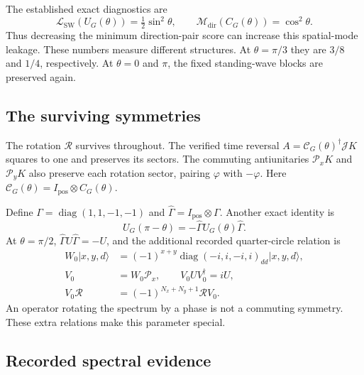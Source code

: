 \documentclass[11pt,a4paper,oneside]{report}
\newcommand{\ket}[1]{\lvert #1\rangle}
\newcommand{\CC}{\mathcal C}
\newcommand{\Id}{I}
\newcommand{\diag}{\operatorname{diag}}
\newcommand{\sw}{\mathrm{SW}}
\numberwithin{equation}{chapter}
\begin{document}
The established exact diagnostics are
\begin{equation}
\boxed{
\mathcal L_{\sw}(U_G(\theta))=\tfrac12\sin^2\theta,\qquad
\mathcal M_{\mathrm{dir}}(C_G(\theta))=\cos^2\theta.
}
\end{equation}
Thus decreasing the minimum direction-pair score can increase this
spatial-mode leakage. These numbers measure different structures.
At \(\theta=\pi/3\) they are \(3/8\) and \(1/4\), respectively.
At \(\theta=0\) and \(\pi\), the fixed standing-wave blocks are
preserved again.

\subsection{The surviving symmetries}

The rotation \(\mathcal R\) survives throughout. The verified
time reversal
\(A=\CC_G(\theta)^\dagger\mathcal J K\) squares to one and
preserves its sectors. The commuting antiunitaries
\(\mathcal P_xK\) and \(\mathcal P_yK\) also preserve each rotation
sector, pairing \(\varphi\) with \(-\varphi\). Here
\(\CC_G(\theta)=\Id_{\mathrm{pos}}\otimes C_G(\theta)\).

Define \(\Gamma=\diag(1,1,-1,-1)\) and
\(\widehat{\Gamma}=\Id_{\mathrm{pos}}\otimes\Gamma\).
Another exact identity is
\begin{equation}
U_G(\pi-\theta)=-\widehat{\Gamma} U_G(\theta)\widehat{\Gamma}.
\end{equation}
At \(\theta=\pi/2\), \(\widehat{\Gamma} U\widehat{\Gamma}=-U\),
and the additional recorded quarter-circle relation is
\begin{align}
W_0\ket{x,y,d}&=(-1)^{x+y}
\diag(-i,i,-i,i)_{dd}\ket{x,y,d},\\
V_0&=W_0\mathcal P_x,\qquad V_0UV_0^\dagger=iU,\\
V_0\mathcal R&=(-1)^{N_x+N_y+1}\mathcal R V_0.
\end{align}
An operator rotating the spectrum by a phase is not a commuting
symmetry. These extra relations make this parameter special.

\subsection{Recorded spectral evidence}
\end{document}
